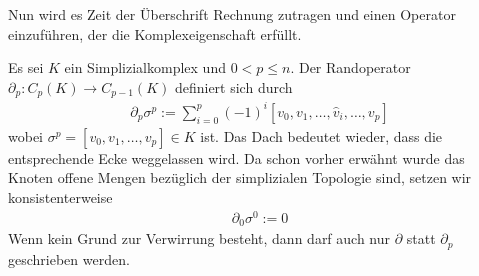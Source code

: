   Nun wird es Zeit der Überschrift Rechnung zutragen und einen Operator einzuführen, der die Komplexeigenschaft erfüllt. 
  
  \begin{definition}
    \label{defRandoperator}
    Es sei \( K \) ein Simplizialkomplex und \( 0 < p \le n \).
    Der Randoperator \( \partial_{p}: C_{p}(K) \rightarrow C_{p-1}(K) \) definiert sich durch
    \begin{align}
      \partial_{p}\sigma^{p} := \sum_{i=0}^{p} (-1)^{i} \left[ v_{0}, v_{1}, \ldots, \hat{v}_{i}, \ldots, v_{p} \right]
    \end{align}
    wobei \( \sigma^{p} = \left[ v_{0}, v_{1}, \ldots, v_{p} \right] \in K\) ist. 
    Das Dach bedeutet wieder, dass die entsprechende Ecke weggelassen wird.
    Da schon vorher erwähnt wurde das Knoten offene Mengen bezüglich der simplizialen Topologie sind, setzen wir konsistenterweise
    \begin{align}
      \partial_{0}\sigma^{0} := 0
    \end{align}
    Wenn kein Grund zur Verwirrung besteht, dann darf auch nur \( \partial \) statt \( \partial_{p} \) geschrieben werden.
  \end{definition}

